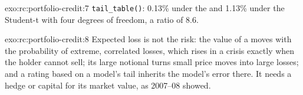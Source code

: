 \begin{solution}{exo:rc:portfolio-credit:7}
\texttt{tail\_table()}: 0.13\% under the  and 1.13\% under the Student-t with
four degrees of freedom, a ratio of 8.6.
\end{solution}

\begin{solution}{exo:rc:portfolio-credit:8}
Expected loss is not the risk: the value of a  moves with the
probability of extreme, correlated losses, which rises in a crisis exactly when the holder
cannot sell; its large notional turns small price moves into large losses; and a rating
based on a model's tail inherits the model's error there. It needs a hedge or capital for
its market value, as 2007--08 showed.
\end{solution}

